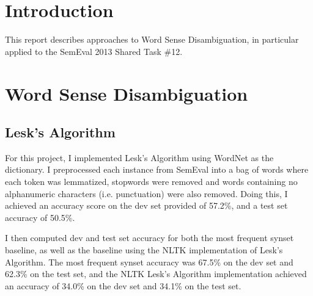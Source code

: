 \documentclass[
10pt, %
a4paper, %
oneside, %
headinclude,footinclude, %
BCOR5mm, %
]{scrartcl}
\begin{document}

\let\thefootnote\relax{}



\section{Introduction}

This report describes approaches to Word Sense Disambiguation, in particular applied to the SemEval 2013 Shared Task \#12.


\section{Word Sense Disambiguation}

\subsection{Lesk's Algorithm}

For this project, I implemented Lesk's Algorithm using WordNet as the dictionary. I preprocessed each instance from SemEval into a bag of words where each token was lemmatized, stopwords were removed and words containing no alphanumeric characters (i.e. punctuation) were also removed. Doing this, I achieved an accuracy score on the dev set provided of 57.2\%, and a test set accuracy of 50.5\%.

I then computed dev and test set accuracy for both the most frequent synset baseline, as well as the baseline using the NLTK implementation of Lesk's Algorithm. The most frequent synset accuracy was 67.5\% on the dev set and 62.3\% on the test set, and the NLTK Lesk's Algorithm implementation achieved an accuracy of 34.0\% on the dev set and 34.1\% on the test set.
\end{document}
